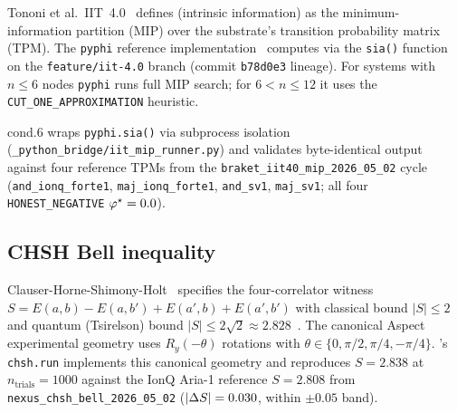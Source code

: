 Tononi et al.\ IIT~4.0~\cite{Tononi-IIT4} defines \phistar{}
(intrinsic information) as the minimum-information partition (MIP)
over the substrate's transition probability matrix (TPM). The
\texttt{pyphi} reference implementation~\cite{pyphi} computes
\phistar{} via the \texttt{sia()} function on the
\texttt{feature/iit-4.0} branch (commit \texttt{b78d0e3} lineage). For
systems with $n \le 6$ nodes \texttt{pyphi} runs full MIP search; for
$6 < n \le 12$ it uses the \texttt{CUT\_ONE\_APPROXIMATION}
heuristic.

\qmirror{} cond.6 wraps \texttt{pyphi.sia()} via subprocess isolation
(\texttt{\_python\_bridge/iit\_mip\_runner.py}) and validates
byte-identical \phistar{} output against four reference TPMs from the
\texttt{braket\_iit40\_mip\_2026\_05\_02} cycle
(\texttt{and\_ionq\_forte1}, \texttt{maj\_ionq\_forte1},
\texttt{and\_sv1}, \texttt{maj\_sv1}; all four
\texttt{HONEST\_NEGATIVE} $\varphi^{\star} = 0.0$).

\subsection{CHSH Bell inequality}

Clauser-Horne-Shimony-Holt~\cite{CHSH-1969} specifies the
four-correlator witness
$S = E(a,b) - E(a,b') + E(a',b) + E(a',b')$
with classical bound $\lvert S\rvert \le 2$ and quantum (Tsirelson)
bound $\lvert S\rvert \le 2\sqrt{2} \approx 2.828$~\cite{Tsirelson-1980}.
The canonical Aspect~\cite{Aspect-1982} experimental geometry uses
$R_{y}(-\theta)$ rotations with $\theta \in \{0, \pi/2, \pi/4,
-\pi/4\}$. \qmirror{}'s \texttt{chsh.run} implements this canonical
geometry and reproduces $S = 2.838$ at $n_{\text{trials}} = 1000$
against the IonQ Aria-1 reference $S = 2.808$ from
\texttt{nexus\_chsh\_bell\_2026\_05\_02}
($\lvert\Delta S\rvert = 0.030$, within $\pm 0.05$ band).
